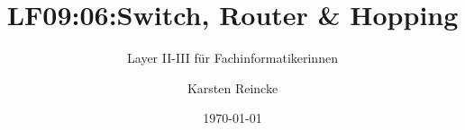 \documentclass[]{beamer}
\title{LF09:06:Switch, Router \& Hopping }
\subtitle{Layer II-III für Fachinformatikerinnen}
\institute{GS-LDK}
\author{Karsten Reincke}
\date{\today}
\def\cfgGl{../../../cfg.gl/}
\begin{document}

\begin{frame}
  \titlepage
\end{frame}






\logo{}
\newpage



%
\end{document}
